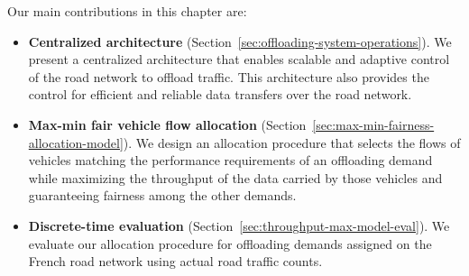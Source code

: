 
Our main contributions in this chapter are:
\begin{itemize}

    \item \textbf{Centralized architecture} (Section~\ref{sec:offloading-system-operations}). We present a centralized architecture that enables scalable and adaptive control of the road network to offload traffic. This architecture also provides the control for efficient and reliable data transfers over the road network.
    
    	
    
    \item \textbf{Max-min fair vehicle flow allocation} (Section~\ref{sec:max-min-fairness-allocation-model}). We design an allocation procedure that selects the flows of vehicles matching the performance requirements of an offloading demand while maximizing the throughput of the data carried by those vehicles and guaranteeing fairness among the other demands. 
    
    \item \textbf{Discrete-time evaluation} (Section~\ref{sec:throughput-max-model-eval}). We evaluate our allocation procedure for offloading demands assigned on the French road network using actual road traffic counts.
    	
\end{itemize}

